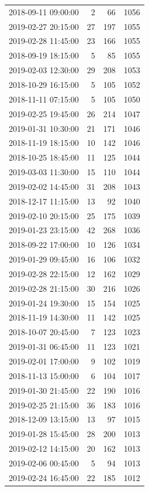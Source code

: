 \begin{tabular}{lrrr}
2018-09-11 09:00:00 & 2 & 66 & 1056 \\
2019-02-27 20:15:00 & 27 & 197 & 1055 \\
2019-02-28 11:45:00 & 23 & 166 & 1055 \\
2018-09-19 18:15:00 & 5 & 85 & 1055 \\
2019-02-03 12:30:00 & 29 & 208 & 1053 \\
2018-10-29 16:15:00 & 5 & 105 & 1052 \\
2018-11-11 07:15:00 & 5 & 105 & 1050 \\
2019-02-25 19:45:00 & 26 & 214 & 1047 \\
2019-01-31 10:30:00 & 21 & 171 & 1046 \\
2018-11-19 18:15:00 & 10 & 142 & 1046 \\
2018-10-25 18:45:00 & 11 & 125 & 1044 \\
2019-03-03 11:30:00 & 15 & 110 & 1044 \\
2019-02-02 14:45:00 & 31 & 208 & 1043 \\
2018-12-17 11:15:00 & 13 & 92 & 1040 \\
2019-02-10 20:15:00 & 25 & 175 & 1039 \\
2019-01-23 23:15:00 & 42 & 268 & 1036 \\
2018-09-22 17:00:00 & 10 & 126 & 1034 \\
2019-01-29 09:45:00 & 16 & 106 & 1032 \\
2019-02-28 22:15:00 & 12 & 162 & 1029 \\
2019-02-28 21:15:00 & 30 & 216 & 1026 \\
2019-01-24 19:30:00 & 15 & 154 & 1025 \\
2018-11-19 14:30:00 & 11 & 142 & 1025 \\
2018-10-07 20:45:00 & 7 & 123 & 1023 \\
2019-01-31 06:45:00 & 11 & 123 & 1021 \\
2019-02-01 17:00:00 & 9 & 102 & 1019 \\
2018-11-13 15:00:00 & 6 & 104 & 1017 \\
2019-01-30 21:45:00 & 22 & 190 & 1016 \\
2019-02-25 21:15:00 & 36 & 183 & 1016 \\
2018-12-09 13:15:00 & 13 & 97 & 1015 \\
2019-01-28 15:45:00 & 28 & 200 & 1013 \\
2019-02-12 14:15:00 & 20 & 162 & 1013 \\
2019-02-06 00:45:00 & 5 & 94 & 1013 \\
2019-02-24 16:45:00 & 22 & 185 & 1012 \\

\end{tabular}
